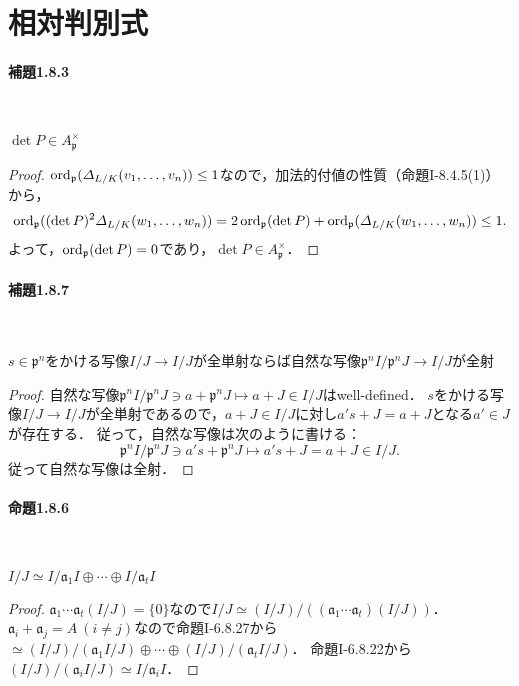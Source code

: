 \section{相対判別式}
\paragraph{補題1.8.3}~
\begin{screen}
  $\det P\in A_\mathfrak{p}^\times$
\end{screen}
\begin{proof}
  $\operatorname{ord}_\mathfrak{p}(\varDelta_{L/K}(v_1, \ldots, v_n))\leq 1$なので，加法的付値の性質（命題I-8.4.5(1)）から，
  \[\operatorname{ord}_\mathfrak{p}((\det P)^2\varDelta_{L/K}(w_1, \ldots, w_n)) = 2\operatorname{ord}_\mathfrak{p}(\det P) + \operatorname{ord}_\mathfrak{p}(\varDelta_{L/K}(w_1, \ldots, w_n))\leq 1.\]
  よって，$\operatorname{ord}_\mathfrak{p}(\det P) = 0$であり，$\det P\in A_\mathfrak{p}^\times$．
\end{proof}

\paragraph{補題1.8.7}~
\begin{screen}
  $s\in\mathfrak{p}^n$をかける写像$I/J\to I/J$が全単射ならば自然な写像$\mathfrak{p}^nI/\mathfrak{p}^nJ\to I/J$が全射
\end{screen}
\begin{proof}
  自然な写像$\mathfrak{p}^nI/\mathfrak{p}^nJ\ni a + \mathfrak{p}^nJ\mapsto a + J\in I/J$はwell-defined．
  $s$をかける写像$I/J\to I/J$が全単射であるので，$a + J\in I/J$に対し$a's + J = a + J$となる$a'\in J$が存在する．
  従って，自然な写像は次のように書ける：
  \[\mathfrak{p}^nI/\mathfrak{p}^nJ\ni a's + \mathfrak{p}^nJ\mapsto a's + J = a + J\in I/J.\]
  従って自然な写像は全射．
\end{proof}

\paragraph{命題1.8.6}~
\begin{screen}
  $I/J\simeq I/\mathfrak{a}_1I\oplus\cdots\oplus I/\mathfrak{a}_tI$
\end{screen}
\begin{proof}
  $\mathfrak{a}_1\cdots\mathfrak{a}_t(I/J) = \{0\}$なので$I/J\simeq (I/J)/((\mathfrak{a}_1\cdots\mathfrak{a}_t)(I/J))$．
  $\mathfrak{a}_i + \mathfrak{a}_j = A\ (i\neq j)$なので命題I-6.8.27から$\simeq (I/J)/(\mathfrak{a}_1I/J)\oplus\cdots\oplus(I/J)/(\mathfrak{a}_tI/J)$．
  命題I-6.8.22から$(I/J)/(\mathfrak{a}_iI/J)\simeq I/\mathfrak{a}_iI$．
\end{proof}

